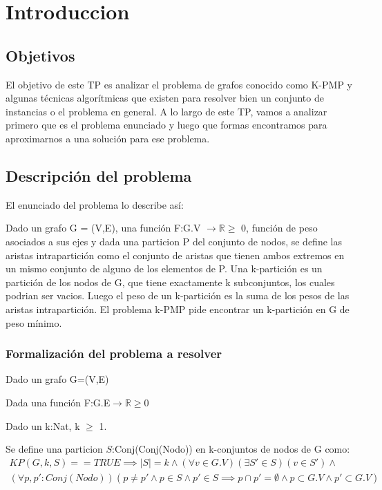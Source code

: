 \section*{Introduccion}

\subsection{Objetivos}

El objetivo de este TP es analizar el problema de grafos conocido como K-PMP y algunas t\'ecnicas algor\'itmicas que existen para resolver bien un conjunto de instancias o el problema en general.
A lo largo de este TP, vamos a analizar primero que es el problema enunciado y luego que formas encontramos para aproximarnos a una soluci\'on para ese problema.

\subsection{Descripci\'on del problema}

El enunciado del problema lo describe as\'i:

Dado un grafo G = (V,E), una funci\'on F:G.V $\rightarrow \mathbb{R} \geq$ 0, funci\'on de peso asociados a sus ejes y dada una particion P del conjunto de nodos, se define las aristas intrapartici\'on como el conjunto de aristas que tienen ambos extremos en un mismo conjunto de alguno de los elementos de P.
Una k-partici\'on es un partici\'on de los nodos de G, que tiene exactamente k subconjuntos, los cuales podrian ser vacios. Luego el peso de un k-partici\'on es la suma de los pesos de las aristas intrapartici\'on.
El problema k-PMP pide encontrar un k-partici\'on en G de peso m\'inimo.

\subsubsection{Formalizaci\'on del problema a resolver}


Dado un grafo G=(V,E)

Dada una funci\'on F:G.E$\rightarrow$$\mathbb{R} \geq 0$

Dado un k:Nat, k $\geq$ 1.

Se define una particion $S$:Conj(Conj(Nodo)) en k-conjuntos de nodos de G como:
\begin{align*}
KP(G,k,S)==TRUE \implies
|S|=k \wedge (\forall v \in G.V)(\exists S'\in S)(v \in S') \wedge \\
(\forall p,p':Conj(Nodo))(p \neq p' \wedge p \in S \wedge p' \in S \implies p \cap p' = \emptyset \wedge p \subset G.V \wedge p' \subset G.V)   
\end{align*}

